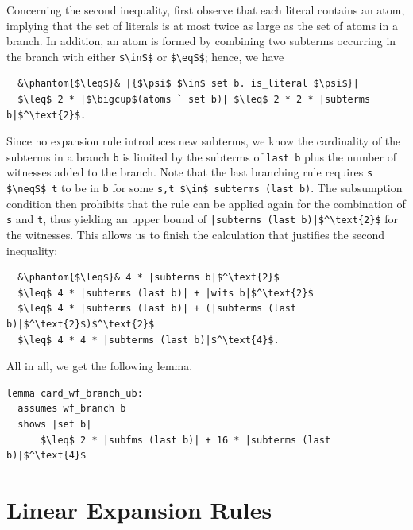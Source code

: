 \documentclass[runningheads]{llncs}
\newcommand{\inS}{\in_\text{s}}
\newcommand{\eqS}{=_\text{s}}
\newcommand{\neqS}{\neq_\text{s}}
\begin{document}
Concerning the second inequality, first observe that each literal contains an atom, implying that the set of literals is at most twice as large as the set of atoms in a branch. 
In addition, an atom is formed by combining two subterms occurring in the branch with either \lstinline!$\inS$! or \lstinline!$\eqS$!;
hence, we have
\begin{lstlisting}
  &\phantom{$\leq$}& |{$\psi$ $\in$ set b. is_literal $\psi$}|
  $\leq$ 2 * |$\bigcup$(atoms ` set b)| $\leq$ 2 * 2 * |subterms b|$^\text{2}$.
\end{lstlisting}
Since no expansion rule introduces new subterms, we know the cardinality of the subterms in a branch \lstinline!b! is limited by the subterms of \lstinline!last b! plus the number of witnesses added to the branch.
Note that the last branching rule requires \lstinline!s $\neqS$ t! to be in \lstinline!b! for some \lstinline!s,t $\in$ subterms (last b)!.
The subsumption condition then prohibits that the rule can be applied again for the combination of \lstinline!s! and \lstinline!t!, thus yielding an upper bound of \lstinline!|subterms (last b)|$^\text{2}$! for the witnesses.
This allows us to finish the calculation that justifies the second inequality:
\begin{lstlisting}
  &\phantom{$\leq$}& 4 * |subterms b|$^\text{2}$
  $\leq$ 4 * |subterms (last b)| + |wits b|$^\text{2}$
  $\leq$ 4 * |subterms (last b)| + (|subterms (last b)|$^\text{2}$)$^\text{2}$
  $\leq$ 4 * 4 * |subterms (last b)|$^\text{4}$.
\end{lstlisting}
All in all, we get the following lemma.
\begin{lstlisting}
lemma card_wf_branch_ub:
  assumes wf_branch b
  shows |set b|
      $\leq$ 2 * |subfms (last b)| + 16 * |subterms (last b)|$^\text{4}$
\end{lstlisting}

\clearpage
\section{Linear Expansion Rules\label{appendix:linear_rules}}
\end{document}
